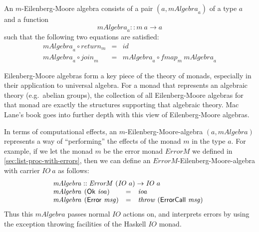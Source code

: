 \begin{definition}
  An $m$-Eilenberg-Moore algebra consists of a pair
  $(a,\mathit{mAlgebra}_a)$ of a type $a$ and a function
  \begin{displaymath}
    \mathit{mAlgebra}_a :: m~a \to a
  \end{displaymath}
  such that the following two equations are satisfied:
  \begin{eqnarray}
    \label{eq:em-alg-return}
    \mathit{mAlgebra}_a \circ \mathit{return}_m & = & \mathit{id} \\
    \label{eq:em-alg-join}
    \mathit{mAlgebra}_a \circ \mathit{join}_m & = & \mathit{mAlgebra}_a \circ \mathit{fmap}_m~\mathit{mAlgebra}_a
  \end{eqnarray}
\end{definition}

Eilenberg-Moore algebras form a key piece of the theory of monads,
especially in their application to universal algebra. For a monad that
represents an algebraic theory (e.g.~abelian groups), the collection
of all Eilenberg-Moore algebras for that monad are exactly the
structures supporting that algebraic theory. Mac Lane's book
\cite{maclane98} goes into further depth with this view of
Eilenberg-Moore algebras.

In terms of computational effects, an $m$-Eilenberg-Moore-algebra $(a,
\mathit{mAlgebra})$ represents a way of ``performing'' the effects of
the monad $m$ in the type $a$. For example, if we let the monad $m$ be
the error monad $\mathit{ErrorM}$ we defined in
\autoref{sec:list-proc-with-errors}, then we can define an
$\mathit{ErrorM}$-Eilenberg-Moore-algebra with carrier $\mathit{IO}~a$
as follows:
\begin{displaymath}
  \begin{array}{l}
    \mathit{mAlgebra} :: \mathit{ErrorM}~(\mathit{IO}~a) \to \mathit{IO}~a \\
    \begin{array}{@{}l@{\hspace{0.4em}}lcl}
      \mathit{mAlgebra}&(\mathsf{Ok}~\mathit{ioa}) & = & \mathit{ioa} \\
      \mathit{mAlgebra}&(\mathsf{Error}~\mathit{msg}) & = & \mathit{throw}~(\mathsf{ErrorCall}~\mathit{msg})
    \end{array}
  \end{array}
\end{displaymath}
Thus this $\mathit{mAlgebra}$ passes normal $\mathit{IO}$ actions on,
and interprets errors by using the exception throwing facilities of
the Haskell $\mathit{IO}$ monad.

